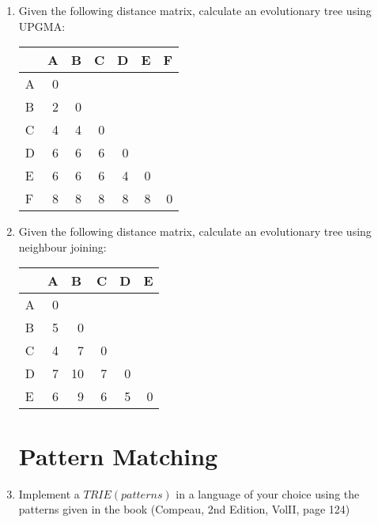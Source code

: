 \documentclass[11pt,runningheads,a4paper]{article}
\begin{document}
\begin{enumerate}
  \item Given the following distance matrix, calculate an evolutionary tree using UPGMA:
    \begin{table}[H]
      \centering
      \begin{tabular}{|l|r|r|r|l|l|l|}
        \hline
        & \multicolumn{1}{l|}{A} & \multicolumn{1}{l|}{B} & \multicolumn{1}{l|}{C} & D & E & F \\ \hline
        A & 0 & \multicolumn{1}{l|}{} & \multicolumn{1}{l|}{} &  &  &  \\ \hline
        B & 2 & 0 & \multicolumn{1}{l|}{} &  &  &  \\ \hline
        C & 4 & 4 & 0 &  &  &  \\ \hline
        D & 6 & 6 & 6 & \multicolumn{1}{r|}{0} &  &  \\ \hline
        E & 6 & 6 & 6 & \multicolumn{1}{r|}{4} & \multicolumn{1}{r|}{0} &  \\ \hline
        F & 8 & 8 & 8 & \multicolumn{1}{r|}{8} & \multicolumn{1}{r|}{8} & \multicolumn{1}{r|}{0} \\ \hline
      \end{tabular}
      \label{}
    \end{table}
  \item  Given the following distance matrix, calculate an evolutionary tree using neighbour joining:
    \begin{table}[H]
      \centering
      \begin{tabular}{|l|r|r|r|l|l|}
        \hline
        & \multicolumn{1}{l|}{A} & \multicolumn{1}{l|}{B} & \multicolumn{1}{l|}{C} & D & E \\ \hline
        A & 0 & \multicolumn{1}{l|}{} & \multicolumn{1}{l|}{} &  &  \\ \hline
        B & 5 & 0 & \multicolumn{1}{l|}{} &  &  \\ \hline
        C & 4 & 7 & 0 &  &  \\ \hline
        D & 7 & 10 & 7 & \multicolumn{1}{r|}{0} &  \\ \hline
        E & 6 & 9 & 6 & \multicolumn{1}{r|}{5} & \multicolumn{1}{r|}{0} \\ \hline
      \end{tabular}
      \label{}
    \end{table}

\section*{Pattern Matching}\label{sec:burrows_wheeler_transformation}
\item  Implement a $TRIE(patterns)$ in a language of your choice using the patterns given in the book (Compeau, 2nd Edition, VolII, page 124) 


\end{enumerate}
\end{document}
